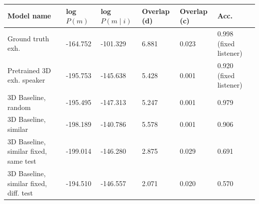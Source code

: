 \begin{table}[]
	\begin{tabularx}{\textwidth}{|X|l|l|X|X|X|}
		\hline
		\textbf{Model name}                                    & \textbf{log $P(m)$} & \textbf{log $P(m \mid i)$} & \textbf{Overlap (d)} & \textbf{Overlap (c)} & \textbf{Acc.} \\ \hline
		Ground truth exh.       &      -164.752            &         -101.329               &       6.881             &      0.023               &       0.998 (fixed listener)       \\ \hline
		Pretrained 3D exh. speaker                            &       -195.753            &         -145.638               &        5.428              &      0.001                & 0.920 (fixed listener)         \\ \hline
		3D Baseline, random  &       -195.495        &           -147.313           &          5.247            &         0.001             & 0.979               \\ \hline
		3D Baseline, similar &      -198.189             &       -140.786                 &           5.578           &        0.001              &         0.906                        \\ \hline
		3D Baseline, similar fixed, same test &      -199.014        &        -146.280           &        2.875       &      0.029   &     0.691                   \\ \hline
		3D Baseline, similar fixed, diff. test &     -194.510     &    -146.557          &   2.071      & 0.020    &     0.570          \\ \hline

\end{tabularx}
\end{table}
